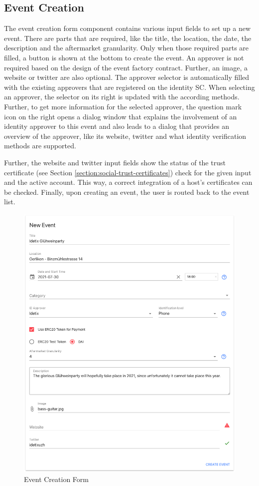 \subsection{Event Creation}\label{design:event-creation}
The event creation form component contains various input fields to set up a new event. There are parts that are required, like the title, the location, the date, the description and the aftermarket granularity. Only when those required parts are filled, a button is shown at the bottom to create the event. An approver is not required based on the design of the event factory contract. Further, an image, a website or twitter are also optional. The approver selector is automatically filled with the existing approvers that are registered on the identity SC. When selecting an approver, the selector on its right is updated with the according methods. Further, to get more information for the selected approver, the question mark icon on the right opens a dialog window that explains the involvement of an identity approver to this event and also leads to a dialog that provides an overview of the approver, like its website, twitter and what identity verification methods are supported.

Further, the website and twitter input fields show the status of the trust certificate (see Section \ref{section:social-trust-certificates}) check for the given input and the active account. This way, a correct integration of a host's certificates can be checked. Finally, upon creating an event, the user is routed back to the event list.

\begin{figure}[H]
    \centering
    \includegraphics[width=15cm]{images/host-event-form.png}
    \caption{Event Creation Form \protect}
    \label{img:host-event-form}
\end{figure}

